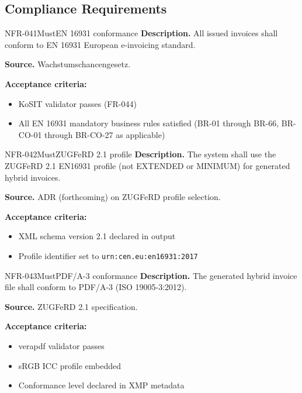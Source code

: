 \documentclass[11pt,a4paper]{article}
\begin{document}
\subsection{Compliance Requirements}

\begin{requirement}{NFR-041}{Must}{EN 16931 conformance}
\textbf{Description.} All issued invoices shall conform to EN 16931 European e-invoicing standard.

\textbf{Source.} Wachstumschancengesetz.

\textbf{Acceptance criteria:}
\begin{itemize}
    \item KoSIT validator passes (FR-044)
    \item All EN 16931 mandatory business rules satisfied (BR-01 through BR-66, BR-CO-01 through BR-CO-27 as applicable)
\end{itemize}
\end{requirement}

\begin{requirement}{NFR-042}{Must}{ZUGFeRD 2.1 profile}
\textbf{Description.} The system shall use the ZUGFeRD 2.1 EN16931 profile (not EXTENDED or MINIMUM) for generated hybrid invoices.

\textbf{Source.} ADR (forthcoming) on ZUGFeRD profile selection.

\textbf{Acceptance criteria:}
\begin{itemize}
    \item XML schema version 2.1 declared in output
    \item Profile identifier set to \texttt{urn:cen.eu:en16931:2017}
\end{itemize}
\end{requirement}

\begin{requirement}{NFR-043}{Must}{PDF/A-3 conformance}
\textbf{Description.} The generated hybrid invoice file shall conform to PDF/A-3 (ISO 19005-3:2012).

\textbf{Source.} ZUGFeRD 2.1 specification.

\textbf{Acceptance criteria:}
\begin{itemize}
    \item verapdf validator passes
    \item sRGB ICC profile embedded
    \item Conformance level declared in XMP metadata
\end{itemize}
\end{requirement}
\end{document}
